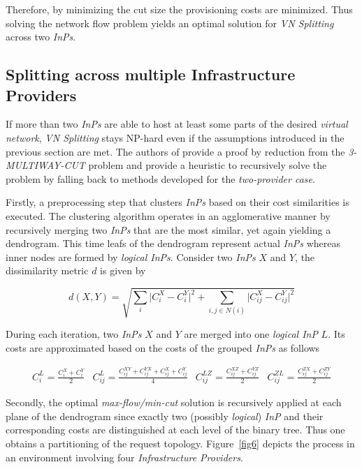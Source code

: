 \documentclass[prodmode,acmtomccap]{acmlarge}
\providecommand{\abs}[1]{\lvert#1\rvert}
\begin{document}
\small

Therefore, by minimizing the cut size the provisioning costs are minimized. Thus  solving the network flow problem yields an optimal solution for \emph{VN Splitting} across two \emph{InPs}.

\subsection{Splitting across multiple Infrastructure Providers}
If more than two \emph{InPs} are able to host at least some parts of the desired \emph{virtual network}, \emph{VN Splitting} stays NP-hard even if the assumptions introduced in the previous section are met.
The authors of  provide a proof by reduction from the \emph{3-MULTIWAY-CUT} problem and provide a heuristic to recursively solve the problem by falling back to methods developed
for the \emph{two-provider case}.

Firstly, a preprocessing step that clusters \emph{InPs} based on their cost similarities is executed. The clustering algorithm operates in an agglomerative manner by recursively merging two
\emph{InPs} that are the most similar, yet again yielding a dendrogram. This time leafs of the dendrogram represent actual \emph{InPs}
whereas inner nodes are formed by \emph{logical InPs}. Consider two \emph{InPs} $X$ and $Y$, the dissimilarity metric $d$ is given by

\normalsize

$$
 d(X,Y) = \sqrt{\sum\limits_{i} \abs{C_i^X - C_i^Y}^2 + \sum\limits_{i, j \in N(i)} \abs{C_{ij}^X - C_{ij}^Y}^2}
$$

\small

During each iteration, two \emph{InPs} $X$ and $Y$ are merged into one \emph{logical InP} $L$. Its costs are approximated based on the costs of the grouped \emph{InPs} as follows

\normalsize

$$
\begin{array}{cccc}
	C_i^L = \frac{C_i^X + C_i^Y}{2} & C_{ij}^{L} = \frac{C_{ij}^{XY} + C_{ij}^{YX} + C_{ij}^{X} + C_{ij}^{Y} }{4} & 
	C_{ij}^{LZ} = \frac{C_{ij}^{XZ} + C_{ij}^{YZ}}{2} & C_{ij}^{ZL} = \frac{C_{ij}^{ZX} + C_{ij}^{ZY}}{2} 
\end{array}
$$

\small

Secondly, the optimal \emph{max-flow/min-cut} solution is recursively applied at each plane of the dendrogram
since exactly two (possibly \emph{logical}) \emph{InP} and their corresponding costs are distinguished at each level of the binary tree. Thus one obtains a partitioning of the request topology.
Figure~\ref{fig6} depicts the process in an environment involving four \emph{Infrastructure Providers}. 
\end{document}
